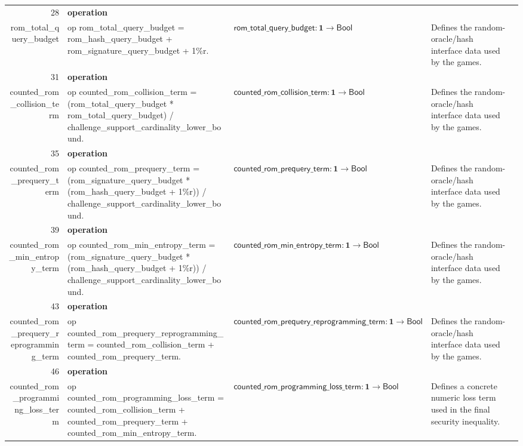 \documentclass[10pt]{article}
\newcommand{\ec}[1]{\begingroup\ttfamily\scriptsize #1\endgroup}
\begin{document}
\begin{longtable}{r L{0.17\textwidth} L{0.26\textwidth} L{0.27\textwidth} L{0.20\textwidth}}
28 & \textbf{operation}\\\ec{rom\_total\_query\_budget} & \ec{op rom\_total\_query\_budget = rom\_hash\_query\_budget + rom\_signature\_query\_budget + 1\%r.} & \(\mathsf{rom\_total\_query\_budget} : \mathbf{1} \to \mathsf{Bool}\) & Defines the random-oracle/hash interface data used by the games. \\
31 & \textbf{operation}\\\ec{counted\_rom\_collision\_term} & \ec{op counted\_rom\_collision\_term = (rom\_total\_query\_budget * rom\_total\_query\_budget) / challenge\_support\_cardinality\_lower\_bound.} & \(\mathsf{counted\_rom\_collision\_term} : \mathbf{1} \to \mathsf{Bool}\) & Defines the random-oracle/hash interface data used by the games. \\
35 & \textbf{operation}\\\ec{counted\_rom\_prequery\_term} & \ec{op counted\_rom\_prequery\_term = (rom\_signature\_query\_budget * (rom\_hash\_query\_budget + 1\%r)) / challenge\_support\_cardinality\_lower\_bound.} & \(\mathsf{counted\_rom\_prequery\_term} : \mathbf{1} \to \mathsf{Bool}\) & Defines the random-oracle/hash interface data used by the games. \\
39 & \textbf{operation}\\\ec{counted\_rom\_min\_entropy\_term} & \ec{op counted\_rom\_min\_entropy\_term = (rom\_signature\_query\_budget * (rom\_hash\_query\_budget + 1\%r)) / challenge\_support\_cardinality\_lower\_bound.} & \(\mathsf{counted\_rom\_min\_entropy\_term} : \mathbf{1} \to \mathsf{Bool}\) & Defines the random-oracle/hash interface data used by the games. \\
43 & \textbf{operation}\\\ec{counted\_rom\_prequery\_reprogramming\_term} & \ec{op counted\_rom\_prequery\_reprogramming\_term = counted\_rom\_collision\_term + counted\_rom\_prequery\_term.} & \(\mathsf{counted\_rom\_prequery\_reprogramming\_term} : \mathbf{1} \to \mathsf{Bool}\) & Defines the random-oracle/hash interface data used by the games. \\
46 & \textbf{operation}\\\ec{counted\_rom\_programming\_loss\_term} & \ec{op counted\_rom\_programming\_loss\_term = counted\_rom\_collision\_term + counted\_rom\_prequery\_term + counted\_rom\_min\_entropy\_term.} & \(\mathsf{counted\_rom\_programming\_loss\_term} : \mathbf{1} \to \mathsf{Bool}\) & Defines a concrete numeric loss term used in the final security inequality. \\

\end{longtable}
\end{document}
